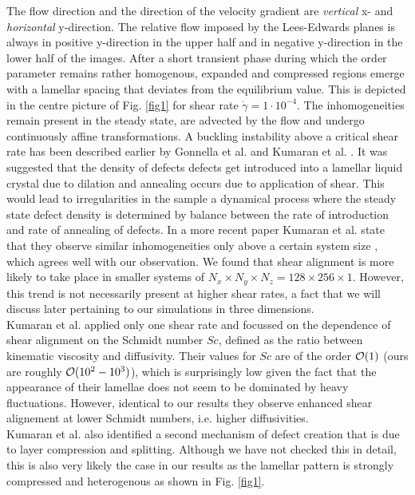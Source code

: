 \documentclass[8.5pt,twoside,twocolumn]{article}
\newcommand{\e}[1]{\cdot10^{#1}}
\newcommand{\gd}{\dot{\gamma}}
\begin{document}
The flow direction and the direction of the velocity gradient are {\it vertical} x- and {\it horizontal} y-direction.
The relative flow imposed by the Lees-Edwards planes is always in positive y-direction in the upper half and in negative y-direction in the lower half of the images.
After a short transient phase during which the order parameter remains rather homogenous, expanded and compressed regions emerge with a lamellar spacing that deviates from the equilibrium value.
This is depicted in the centre picture of Fig. \ref{fig1} for shear rate $\gd= 1\e{-4}$.
The inhomogeneities remain present in the steady state, are advected by the flow and undergo continuously affine transformations.
A buckling instability above a critical shear rate has been described earlier by Gonnella et al. \cite{Gonnella98} and Kumaran et al. \cite{Kumaran2001}.
It was suggested that the density of defects defects get introduced into a lamellar liquid crystal due to dilation and annealing occurs due to application of shear.
This would lead to irregularities in the sample a dynamical process where the steady state defect density is determined by balance between the rate of introduction and rate of annealing of defects.
In a more recent paper Kumaran et al. state that they observe similar inhomogeneities only above a certain system size \cite{Kumaran2011}, which agrees well with our observation.
We found that shear alignment is more likely to take place in smaller systems of $N_x\times N_y\times N_z=128\times 256\times 1$.
However, this trend is not necessarily present at higher shear rates, a fact that we will discuss later pertaining to our simulations in three dimensions.\\
Kumaran et al. applied only one shear rate and focussed on the dependence of shear alignment on the Schmidt number $Sc$, defined as the ratio between kinematic viscosity and diffusivity.
Their values for $Sc$ are of the order ${\cal O}(1)$ (ours are roughly ${\cal O}(10^2-10^3)$), which is surprisingly low given the fact that the appearance of their lamellae does not seem to be dominated by heavy fluctuations.
However, identical to our results they observe enhanced shear alignement at lower Schmidt numbers, i.e. higher diffusivities.\\
Kumaran et al. also identified a second mechanism of defect creation that is due to layer compression and splitting.
Although we have not checked this in detail, this is also very likely the case in our results as the lamellar pattern is strongly compressed and heterogenous as shown in Fig. \ref{fig1}.\\
\end{document}
